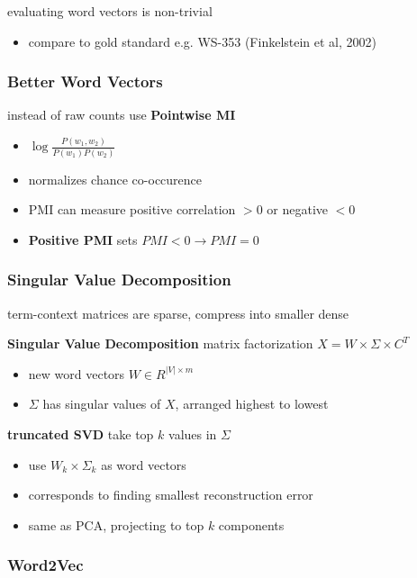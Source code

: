 \documentclass[]{article}
\theoremstyle{definition}
\begin{document}
evaluating word vectors is non-trivial
\begin{itemize}
    \item compare to gold standard e.g. WS-353 (Finkelstein et al, 2002)
\end{itemize}

\subsubsection{Better Word Vectors}%
\label{ssub:better_word_vectors}

instead of raw counts use \textbf{Pointwise MI}
\begin{itemize}
    \item $\log \frac{P(w_1,w_2)}{P(w_1)P(w_2)}$
    \item normalizes chance co-occurence
    \item PMI can measure positive correlation $>0$ or negative $<0$
    \item \textbf{Positive PMI} sets $PMI < 0 \to PMI = 0$
\end{itemize}

\subsubsection{Singular Value Decomposition}%
\label{ssub:singular_value_decomposition}

term-context matrices are sparse, compress into smaller dense

\textbf{Singular Value Decomposition} matrix factorization $X = W \times \Sigma \times C^T$
\begin{itemize}
    \item new word vectors $W \in R^{|V| \times m}$
    \item $\Sigma$ has singular values of $X$, arranged highest to lowest
\end{itemize}

\textbf{truncated SVD} take top $k$ values in $\Sigma$
\begin{itemize}
    \item use $W_k \times \Sigma_k$ as word vectors
    \item corresponds to finding smallest reconstruction error
    \item same as PCA, projecting to top $k$ components
\end{itemize}

\subsubsection{Word2Vec}%
\label{ssub:word2vec}
\end{document}
